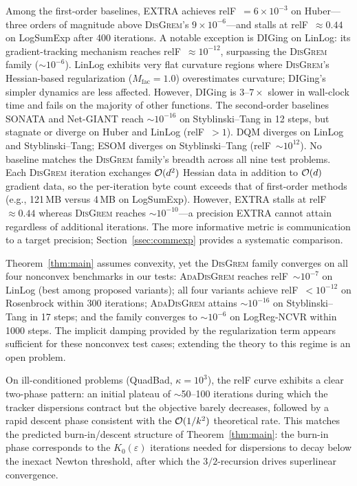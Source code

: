 \documentclass[review,onefignum,onetabnum]{siamart171218}
\begin{document}
	Among the first-order baselines,
	EXTRA achieves relF~$=6{\times}10^{-3}$ on Huber---three
	orders of magnitude above \textsc{DisGrem}'s
	$9{\times}10^{-6}$---and
	stalls at relF~$\approx0.44$ on LogSumExp after 400
	iterations.
	A notable exception is DIGing on LinLog: its gradient-tracking
	mechanism reaches relF~$\approx10^{-12}$, surpassing the
	\textsc{DisGrem} family ($\sim10^{-6}$).
	LinLog exhibits very flat curvature regions where
	\textsc{DisGrem}'s Hessian-based regularization
	($M_{\mathrm{fac}}{=}1.0$) overestimates curvature;
	DIGing's simpler dynamics are less affected.
	However, DIGing is $3$--$7\times$ slower in wall-clock time
	and fails on the majority of other functions.
	The second-order baselines SONATA and Net-GIANT reach $\sim10^{-16}$ on
	Styblinski--Tang in 12 steps, but stagnate or diverge on
	Huber and LinLog (relF~$>1$).
	DQM diverges on LinLog and Styblinski--Tang; ESOM diverges
	on Styblinski--Tang (relF~$\sim10^{12}$).
	No baseline matches the \textsc{DisGrem} family's breadth
	across all nine test problems.
	Each \textsc{DisGrem} iteration exchanges $\mathcal{O}(d^2)$ Hessian
	data in addition to $\mathcal{O}(d)$ gradient data, so the
	per-iteration byte count exceeds that of first-order methods
	(e.g., 121\,MB versus 4\,MB on LogSumExp).
	However, EXTRA stalls at relF~$\approx0.44$ whereas
	\textsc{DisGrem} reaches $\sim10^{-10}$---a precision EXTRA
	cannot attain regardless of additional iterations.
	The more informative metric is communication to a
	target precision; Section~\ref{ssec:commexp} provides a
	systematic comparison.

	Theorem~\ref{thm:main} assumes convexity, yet the \textsc{DisGrem}
	family converges on all four nonconvex benchmarks in our tests:
	\textsc{AdaDisGrem} reaches relF~$\sim10^{-7}$ on LinLog (best
	among proposed variants); all four variants achieve
	relF~$<10^{-12}$ on Rosenbrock within 300 iterations;
	\textsc{AdaDisGrem} attains $\sim10^{-16}$ on Styblinski--Tang in
	17 steps; and the family converges to $\sim10^{-6}$ on
	LogReg-NCVR within 1000 steps.
	The implicit damping provided by the regularization term appears
	sufficient for these nonconvex test cases; extending the theory
	to this regime is an open problem.

	On ill-conditioned problems (QuadBad, $\kappa{=}10^3$), the relF
	curve exhibits a clear two-phase pattern: an initial plateau of
	$\sim$50--100 iterations during which the tracker dispersions
	contract but the objective barely decreases, followed by a rapid
	descent phase consistent with the $\mathcal{O}(1/k^2)$ theoretical rate.
	This matches the predicted burn-in/descent structure of
	Theorem~\ref{thm:main}: the burn-in phase corresponds to the
	$K_0(\varepsilon)$ iterations needed for dispersions to decay below
	the inexact Newton threshold, after which the $3/2$-recursion
	drives superlinear convergence.
	
\end{document}
